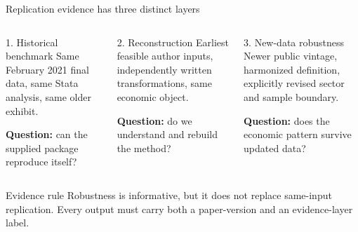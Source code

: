 
\begin{frame}{Replication evidence has three distinct layers}
  \begin{columns}[T,onlytextwidth]
    \begin{block}{1. Historical benchmark}
      \small
      Same February 2021 final data, same Stata analysis, same older exhibit.

      \vspace{0.15cm}
      \textbf{Question:} can the supplied package reproduce itself?
    \end{block}

    \begin{block}{2. Reconstruction}
      \small
      Earliest feasible author inputs, independently written transformations,
      same economic object.

      \vspace{0.15cm}
      \textbf{Question:} do we understand and rebuild the method?
    \end{block}

    \begin{block}{3. New-data robustness}
      \small
      Newer public vintage, harmonized definition, explicitly revised sector
      and sample boundary.

      \vspace{0.15cm}
      \textbf{Question:} does the economic pattern survive updated data?
    \end{block}
  \end{columns}

  \vspace{0.25cm}
  \begin{alertblock}{Evidence rule}
    Robustness is informative, but it does not replace same-input replication.
    Every output must carry both a paper-version and an evidence-layer label.
  \end{alertblock}
\end{frame}

